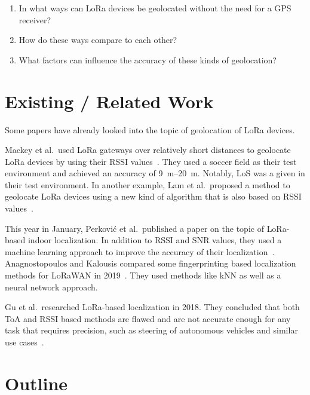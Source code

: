 
\begin{enumerate}
      \item In what ways can \ac{LoRa} devices be geolocated without the need for a \ac{GPS} receiver?
      \item How do these ways compare to each other?
      \item What factors can influence the accuracy of these kinds of geolocation?
\end{enumerate}

\section{Existing / Related Work}

Some papers have already looked into the topic of geolocation of \ac{LoRa} devices.

Mackey et al.~used \ac{LoRa} gateways over relatively short distances to geolocate \ac{LoRa} devices by using their \ac{RSSI} values~\cite{mackey_lora-based_2019}.
They used a soccer field as their test environment and achieved an accuracy of \SIrange{9}{20}{\meter}.
Notably, \ac{LoS} was a given in their test environment.
In another example, Lam et al.~proposed a method to geolocate \ac{LoRa} devices using a new kind of algorithm that is also based on \ac{RSSI} values~\cite{lam_new_2018}.

This year in January, Perković et al.\ published a paper on the topic of \ac{LoRa}-based indoor localization.
In addition to \ac{RSSI} and \ac{SNR} values, they used a machine learning approach to improve the accuracy of their localization~\cite{perkovic_machine_2023}.
Anagnostopoulos and Kalousis compared some fingerprinting based localization methods for \ac{LoRaWAN} in 2019~\cite{anagnostopoulos_reproducible_2019}.
They used methods like \ac{kNN} as well as a neural network approach.

Gu et al.\ researched \ac{LoRa}-based localization in 2018.
They concluded that both \ac{ToA} and \ac{RSSI} based methods are flawed and are not accurate enough for any task that requires precision, such as steering of autonomous vehicles and similar use cases~\cite{gu_lora-based_2018}.


\section{Outline}

